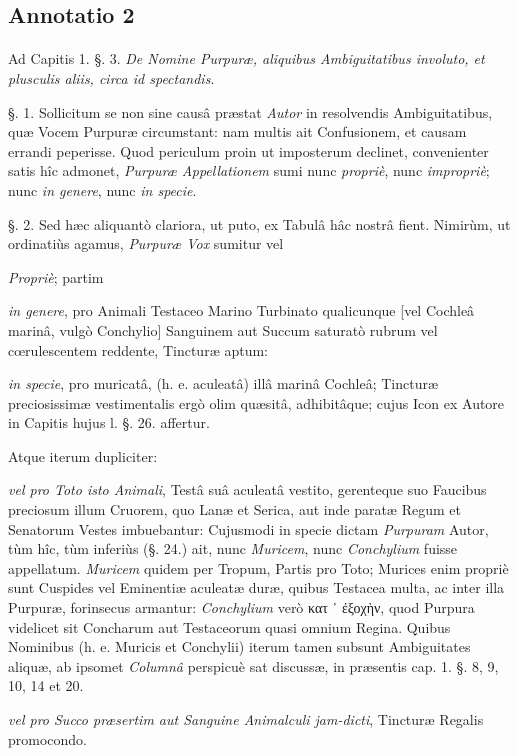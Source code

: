 \documentclass[a4paper, 11pt, oneside, polutonikogreek, german]{article}
\begin{document}
\subsection{Annotatio 2}
\paragraph{}
Ad Capitis 1. §. 3. \emph{De Nomine Purpuræ, aliquibus Ambiguitatibus involuto, et plusculis aliis, circa id spectandis}.

§. 1. Sollicitum se non sine causâ præstat \emph{Autor} in resolvendis Ambiguitatibus, quæ Vocem Purpuræ circumstant: nam multis ait Confusionem, et causam errandi peperisse. Quod periculum proin ut imposterum declinet, convenienter satis hîc admonet, \emph{Purpuræ Appellationem} sumi nunc \emph{propriè}, nunc \emph{impropriè}; nunc \emph{in genere}, nunc \emph{in specie}.

§. 2. Sed hæc aliquantò clariora, ut puto, ex Tabulâ hâc nostrâ fient. Nimirùm, ut ordinatiùs agamus, \emph{Purpuræ Vox} sumitur vel

\emph{Propriè}; partim

\emph{in genere}, pro Animali Testaceo Marino Turbinato qualicunque [vel Cochleâ marinâ, vulgò Conchylio] Sanguinem aut Succum saturatò rubrum vel cœrulescentem reddente, Tincturæ aptum:

\emph{in specie}, pro muricatâ, (h. e. aculeatâ) illâ marinâ Cochleâ; Tincturæ preciosissimæ vestimentalis ergò olim quæsitâ, adhibitâque; cujus Icon ex Autore in Capitis hujus l. §. 26. affertur.

Atque iterum dupliciter:

\emph{vel pro Toto isto Animali}, Testâ suâ aculeatâ vestito, gerenteque suo Faucibus preciosum illum Cruorem, quo Lanæ et Serica, aut inde paratæ Regum et Senatorum Vestes imbuebantur: Cujusmodi in specie dictam \emph{Purpuram} Autor, tùm hîc, tùm inferiùs (§. 24.) ait, nunc \emph{Muricem}, nunc \emph{Conchylium} fuisse appellatum. \emph{Muricem} quidem per Tropum, Partis pro Toto; Murices enim propriè sunt Cuspides vel Eminentiæ aculeatæ duræ, quibus Testacea multa, ac inter illa Purpuræ, forinsecus armantur: \emph{Conchylium} verò κατ ᾽ ἐξοχὴν, quod Purpura videlicet sit Concharum aut Testaceorum quasi omnium Regina. Quibus Nominibus (h. e. Muricis et Conchylii) iterum tamen subsunt Ambiguitates aliquæ, ab ipsomet \emph{Columnâ} perspicuè sat discussæ, in præsentis cap. 1. §. 8, 9, 10, 14 et 20.

\emph{vel pro Succo præsertim aut Sanguine Animalculi jam-dicti}, Tincturæ Regalis promocondo.
\end{document}
